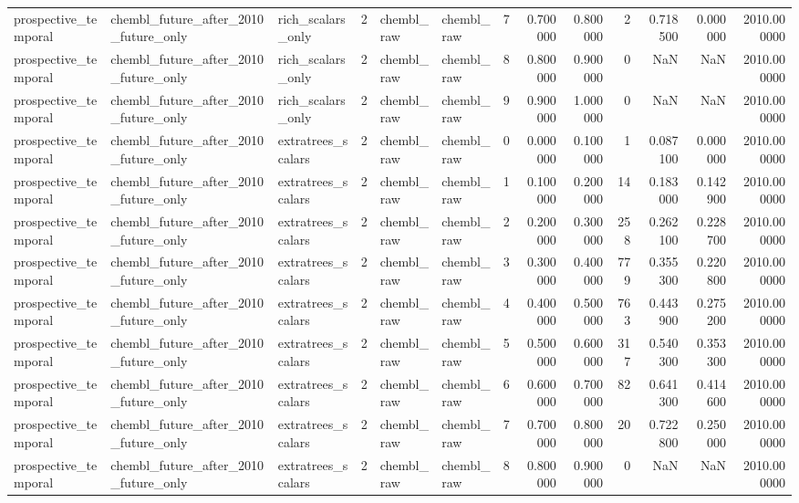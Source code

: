 \begin{longtable}{lllrllrrrrrrr}
prospective\_temporal & chembl\_future\_after\_2010\_future\_only & rich\_scalars\_only & 2 & chembl\_raw & chembl\_raw & 7 & 0.700000 & 0.800000 & 2 & 0.718500 & 0.000000 & 2010.000000 \\
prospective\_temporal & chembl\_future\_after\_2010\_future\_only & rich\_scalars\_only & 2 & chembl\_raw & chembl\_raw & 8 & 0.800000 & 0.900000 & 0 & NaN & NaN & 2010.000000 \\
prospective\_temporal & chembl\_future\_after\_2010\_future\_only & rich\_scalars\_only & 2 & chembl\_raw & chembl\_raw & 9 & 0.900000 & 1.000000 & 0 & NaN & NaN & 2010.000000 \\
prospective\_temporal & chembl\_future\_after\_2010\_future\_only & extratrees\_scalars & 2 & chembl\_raw & chembl\_raw & 0 & 0.000000 & 0.100000 & 1 & 0.087100 & 0.000000 & 2010.000000 \\
prospective\_temporal & chembl\_future\_after\_2010\_future\_only & extratrees\_scalars & 2 & chembl\_raw & chembl\_raw & 1 & 0.100000 & 0.200000 & 14 & 0.183000 & 0.142900 & 2010.000000 \\
prospective\_temporal & chembl\_future\_after\_2010\_future\_only & extratrees\_scalars & 2 & chembl\_raw & chembl\_raw & 2 & 0.200000 & 0.300000 & 258 & 0.262100 & 0.228700 & 2010.000000 \\
prospective\_temporal & chembl\_future\_after\_2010\_future\_only & extratrees\_scalars & 2 & chembl\_raw & chembl\_raw & 3 & 0.300000 & 0.400000 & 779 & 0.355300 & 0.220800 & 2010.000000 \\
prospective\_temporal & chembl\_future\_after\_2010\_future\_only & extratrees\_scalars & 2 & chembl\_raw & chembl\_raw & 4 & 0.400000 & 0.500000 & 763 & 0.443900 & 0.275200 & 2010.000000 \\
prospective\_temporal & chembl\_future\_after\_2010\_future\_only & extratrees\_scalars & 2 & chembl\_raw & chembl\_raw & 5 & 0.500000 & 0.600000 & 317 & 0.540300 & 0.353300 & 2010.000000 \\
prospective\_temporal & chembl\_future\_after\_2010\_future\_only & extratrees\_scalars & 2 & chembl\_raw & chembl\_raw & 6 & 0.600000 & 0.700000 & 82 & 0.641300 & 0.414600 & 2010.000000 \\
prospective\_temporal & chembl\_future\_after\_2010\_future\_only & extratrees\_scalars & 2 & chembl\_raw & chembl\_raw & 7 & 0.700000 & 0.800000 & 20 & 0.722800 & 0.250000 & 2010.000000 \\
prospective\_temporal & chembl\_future\_after\_2010\_future\_only & extratrees\_scalars & 2 & chembl\_raw & chembl\_raw & 8 & 0.800000 & 0.900000 & 0 & NaN & NaN & 2010.000000 \\

\end{longtable}
